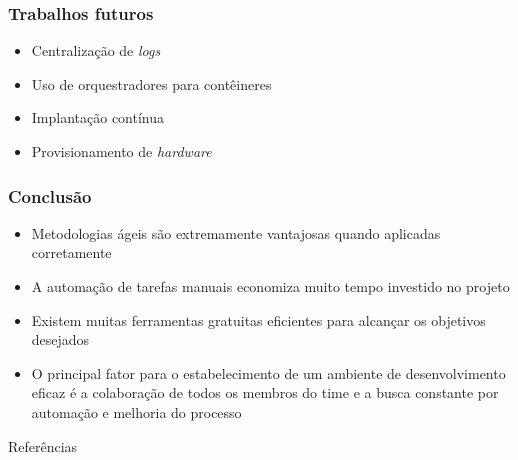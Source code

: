\documentclass[aspectratio=169]{beamer}
\begin{document}
\begin{frame}
	\frametitle{Trabalhos futuros}
	
	\begin{itemize}
		
		\item Centralização de \textit{logs}
		
		\item Uso de orquestradores para contêineres
		
		\item Implantação contínua
		
		\item Provisionamento de \textit{hardware}
		
	\end{itemize}
	
\end{frame}

\begin{frame}
	\frametitle{Conclusão}
	
	\begin{itemize}
		
		\item Metodologias ágeis são extremamente vantajosas quando aplicadas corretamente
		
		\item A automação de tarefas manuais economiza muito tempo investido no projeto
		
		\item Existem muitas ferramentas gratuitas eficientes para alcançar os objetivos desejados
		
		\item O principal fator para o estabelecimento de um ambiente de desenvolvimento eficaz é a colaboração de todos os membros do time e a busca constante por automação e melhoria do processo
		
	\end{itemize}
	
\end{frame}



\begin{frame}[allowframebreaks]{Referências}

\end{frame}

\end{document}

